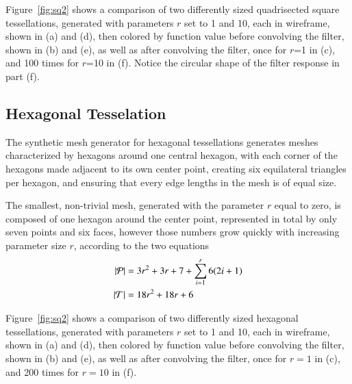 Figure~\ref{fig:sq2} shows a comparison of two differently sized quadrisected square tessellations, generated with parameters $r$ set to 1 and 10, each in wireframe, shown in (a) and (d), then colored by function value before convolving the filter, shown in (b) and (e), as well as after convolving the filter, once for $r$=1 in (c), and 100 times for $r$=10 in (f). Notice the circular shape of the filter response in part (f).



%
%
%
%
\pagebreak
\subsection{Hexagonal Tesselation}
The synthetic mesh generator for hexagonal tessellations generates meshes characterized by hexagons around one central hexagon, with each corner of the hexagons made adjacent to its own center point, creating six equilateral triangles per hexagon, and ensuring that every edge lengths in the mesh is of equal size.

The smallest, non-trivial mesh, generated with the parameter $r$ equal to zero, is composed of one hexagon around the center point, represented in total by only seven points and six faces, however those numbers grow quickly with increasing parameter size $r$, according to the two equations
\begin{align}
	|\mathcal{P}| &= 3r^2 + 3r + 7 +\sum_{i=1}^r{6(2i + 1)}\\
	|\mathcal{T}| &= 18r^2 + 18r + 6
	\label{eq:hexPointAndFaceCounts}
\end{align}

Figure~\ref{fig:sq2} shows a comparison of two differently sized hexagonal tessellations, generated with parameters $r$ set to 1 and 10, each in wireframe, shown in (a) and (d), then colored by function value before convolving the filter, shown in (b) and (e), as well as after convolving the filter, once for $r=1$ in (c), and 200 times for $r=10$ in (f).


%
%
%
%
\pagebreak
